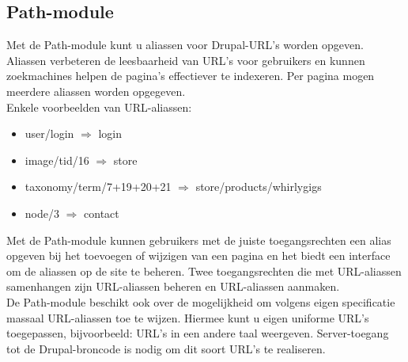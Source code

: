 \subsection{Path-module} 
Met de Path-module kunt u aliassen voor Drupal-URL's worden opgeven. 
Aliassen verbeteren de leesbaarheid van URL's voor gebruikers en kunnen 
zoekmachines helpen de pagina's effectiever te indexeren. Per pagina mogen meerdere aliassen worden opgegeven.
\\
Enkele voorbeelden van URL-aliassen:
\begin{itemize}
\item user/login $\Rightarrow$ login
\item image/tid/16 $\Rightarrow$ store
\item taxonomy/term/7+19+20+21 $\Rightarrow$ store/products/whirlygigs
\item node/3 $\Rightarrow$ contact
\end{itemize}
Met de Path-module kunnen gebruikers met de juiste toegangsrechten een alias opgeven bij het toevoegen 
of wijzigen van een pagina en het biedt een interface om de aliassen op de site te beheren. 
Twee toegangsrechten die met URL-aliassen samenhangen zijn URL-aliassen beheren en URL-aliassen aanmaken.
\\
De Path-module beschikt ook over de mogelijkheid om volgens eigen specificatie massaal URL-aliassen 
toe te wijzen. Hiermee kunt u eigen uniforme URL's toegepassen, bijvoorbeeld: URL's in een andere taal 
weergeven. Server-toegang tot de Drupal-broncode is nodig om dit soort URL's te realiseren. 
